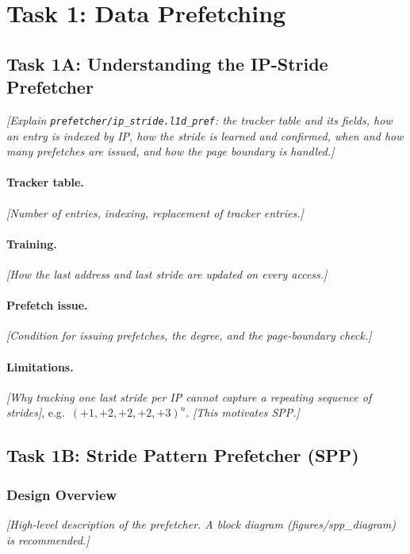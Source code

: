 \documentclass[11pt,a4paper]{article}
\theoremstyle{themethm}
\theoremstyle{themedef}
\theoremstyle{themeex}
\theoremstyle{themerem}
\newcommand{\todo}[1]{\textcolor{black!55}{\textit{[#1]}}}
\begin{document}
\section{Task 1: Data Prefetching}\label{sec:task1}

\subsection{Task 1A: Understanding the IP-Stride Prefetcher}\label{sec:task1a}
\todo{Explain \texttt{prefetcher/ip\_stride.l1d\_pref}: the tracker table and its fields, how an entry is indexed by IP, how the stride is learned and confirmed, when and how many prefetches are issued, and how the page boundary is handled.}

\paragraph{Tracker table.} \todo{Number of entries, indexing, replacement of tracker entries.}

\paragraph{Training.} \todo{How the last address and last stride are updated on every access.}

\paragraph{Prefetch issue.} \todo{Condition for issuing prefetches, the degree, and the page-boundary check.}

\paragraph{Limitations.} \todo{Why tracking one last stride per IP cannot capture a repeating sequence of strides}, e.g.\ $(+1,+2,+2,+2,+3)^n$. \todo{This motivates SPP.}

\subsection{Task 1B: Stride Pattern Prefetcher (SPP)}\label{sec:task1b}

\subsubsection{Design Overview}\label{sec:spp-design}
\todo{High-level description of the prefetcher. A block diagram (figures/spp\_diagram) is recommended.}
\end{document}
